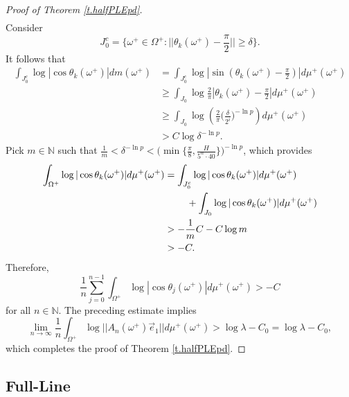 \documentclass{amsart}
\newcommand{\NN}{\mathbb{N}}
\begin{document}
\begin{proof}[Proof of Theorem \ref{t.halfPLEpd}]
\begin{align*}
    \end{align*}
    Consider
    \[J_0^c = \{\omega^+\in \Omega^+: ||\theta_k(\omega^+)-\frac{\pi}{2}||\geq  \delta\}.\]
    It follows that
    \begin{align*}
        \int_{J_0^c} \log|\cos\theta_k(\omega^+)|dm(\omega^+) &= \int_{J_0^c} \log|\sin(\theta_k(\omega^+) - \frac{\pi}{2})|d\mu^+(\omega^+)\\
        &\geq \int_{J_0} \log\frac{2}{\pi}|\theta_k(\omega^+) - \frac{\pi}{2}|d\mu^+(\omega^+)\\
        &\geq \int_{J_0} \log(\frac{2}{\pi}\Big(\frac{\delta}{2^i}\Big)^{- \ln p})d\mu^+(\omega^+)\\
        &> C\log\delta^{-\ln p}.
    \end{align*}
    Pick $m\in \NN$ such that $\frac{1}{m} < \delta^{-\ln p} < \Big(\min\{\frac{\pi}{8}, \frac{H}{5^\alpha\cdot 40}\}\Big)^{-\ln p}$, which provides
    \begin{align*}
        \int_{\Omega^+} \log|\cos\theta_k(\omega^+)|d\mu^+(\omega^+) &= \int_{J_0^c} \log|\cos\theta_k(\omega^+)|d\mu^+(\omega^+)\\
        &\hspace{8mm}+ \int_{J_0} \log|\cos\theta_k(\omega^+)|d\mu^+(\omega^+)\\
        &> -\frac{1}{m}C - C\log m\\
        &> -C.
    \end{align*}
    Therefore, 
    \[\frac{1}{n}\sum_{j=0}^{n-1} \int_{\Omega^+} \log|\cos\theta_j(\omega^+)| d\mu^+(\omega^+) > -C\]
    for all $n\in \NN$. The preceding estimate implies
    \[\lim_{n\rightarrow \infty} \frac{1}{n}\int_{\Omega^+} \log ||A_n(\omega^+)\vec{e}_1|| d\mu^+(\omega^+) > \log \lambda - C_0 = \log\lambda - C_0,\]
    which completes the proof of Theorem \ref{t.halfPLEpd}.
\end{proof}

\subsection{Full-Line}\hypertarget{fullline}{}
\end{document}
